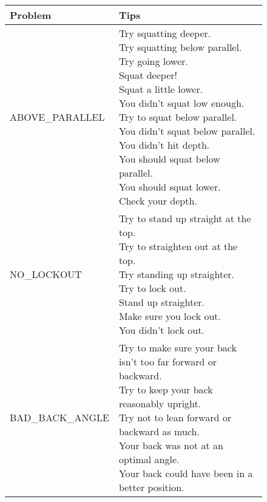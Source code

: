 \begin{figure}[H]
    \centering
	\begin{tabular}{ | l | p{10cm} | }
		\hline
	    \textbf{Problem} & \textbf{Tips}\\ \hline
	    ABOVE\_PARALLEL & \parbox{10cm}{\vspace{.5\baselineskip} 
			Try squatting deeper. \\
			Try squatting below parallel. \\
			Try going lower. \\
			Squat deeper! \\
			Squat a little lower. \\
			You didn't squat low enough. \\
			Try to squat below parallel. \\
			You didn't squat below parallel. \\
			You didn't hit depth. \\
			You should squat below parallel. \\
			You should squat lower. \\
			Check your depth. \\} \\
		\hline

		NO\_LOCKOUT & \parbox{10cm}{\vspace{.5\baselineskip}
			Try to stand up straight at the top. \\
			Try to straighten out at the top. \\
			Try standing up straighter. \\
			Try to lock out. \\
			Stand up straighter. \\
			Make sure you lock out. \\
			You didn't lock out. \\} \\
		\hline

		BAD\_BACK\_ANGLE & \parbox{10cm}{\vspace{.5\baselineskip}
			Try to make sure your back isn't too far forward or backward. \\
			Try to keep your back reasonably upright. \\
			Try not to lean forward or backward as much. \\
			Your back was not at an optimal angle. \\
			Your back could have been in a better position. \\} \\
		\hline


\end{tabular}
\end{figure}
